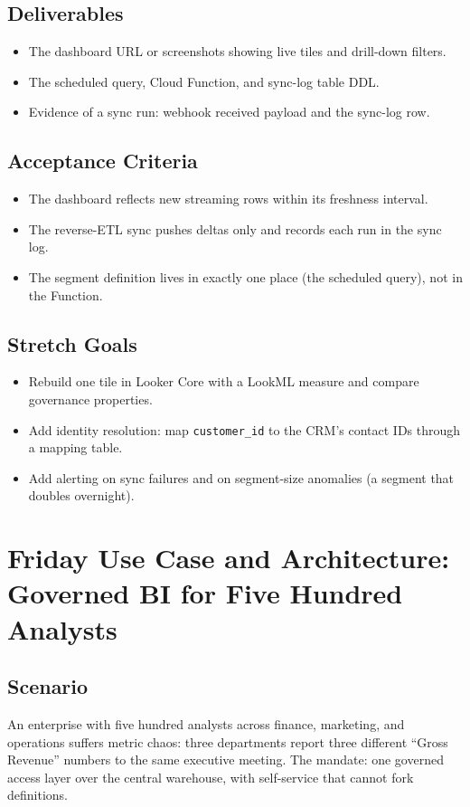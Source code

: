 \subsection*{Deliverables}
\begin{itemize}
    \item The dashboard URL or screenshots showing live tiles and drill-down filters.
    \item The scheduled query, Cloud Function, and sync-log table DDL.
    \item Evidence of a sync run: webhook received payload and the sync-log row.
\end{itemize}

\subsection*{Acceptance Criteria}
\begin{itemize}
    \item The dashboard reflects new streaming rows within its freshness interval.
    \item The reverse-ETL sync pushes deltas only and records each run in the sync log.
    \item The segment definition lives in exactly one place (the scheduled query), not in the Function.
\end{itemize}

\subsection*{Stretch Goals}
\begin{itemize}
    \item Rebuild one tile in Looker Core with a LookML measure and compare governance properties.
    \item Add identity resolution: map \texttt{customer\_id} to the CRM's contact IDs through a mapping table.
    \item Add alerting on sync failures and on segment-size anomalies (a segment that doubles overnight).
\end{itemize}

\section{Friday Use Case and Architecture: Governed BI for Five Hundred Analysts}

\subsection{Scenario}
An enterprise with five hundred analysts across finance, marketing, and operations suffers metric chaos: three departments report three different ``Gross Revenue'' numbers to the same executive meeting. The mandate: one governed access layer over the central warehouse, with self-service that cannot fork definitions.


